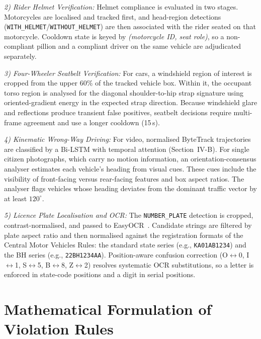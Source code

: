 \documentclass[conference]{IEEEtran}
\begin{document}
\textit{2) Rider Helmet Verification:} Helmet compliance is evaluated in two stages. Motorcycles are localised and tracked first, and head-region detections (\texttt{WITH\_HELMET}/\texttt{WITHOUT\_HELMET}) are then associated with the rider seated on that motorcycle. Cooldown state is keyed by \emph{(motorcycle ID, seat role)}, so a non-compliant pillion and a compliant driver on the same vehicle are adjudicated separately.

\textit{3) Four-Wheeler Seatbelt Verification:} For cars, a windshield region of interest is cropped from the upper 60\% of the tracked vehicle box. Within it, the occupant torso region is analysed for the diagonal shoulder-to-hip strap signature using oriented-gradient energy in the expected strap direction. Because windshield glare and reflections produce transient false positives, seatbelt decisions require multi-frame agreement and use a longer cooldown (15\,s).

\textit{4) Kinematic Wrong-Way Driving:} For video, normalised ByteTrack trajectories are classified by a Bi-LSTM with temporal attention (Section~IV-B). For single citizen photographs, which carry no motion information, an orientation-consensus analyser estimates each vehicle's heading from visual cues. These cues include the visibility of front-facing versus rear-facing features and box aspect ratios. The analyser flags vehicles whose heading deviates from the dominant traffic vector by at least $120^{\circ}$.

\textit{5) Licence Plate Localisation and OCR:} The \texttt{NUMBER\_PLATE} detection is cropped, contrast-normalised, and passed to EasyOCR~\cite{easyocr}. Candidate strings are filtered by plate aspect ratio and then normalised against the registration formats of the Central Motor Vehicles Rules: the standard state series (e.g., \texttt{KA01AB1234}) and the BH series (e.g., \texttt{22BH1234AA}). Position-aware confusion correction (O$\leftrightarrow$0, I$\leftrightarrow$1, S$\leftrightarrow$5, B$\leftrightarrow$8, Z$\leftrightarrow$2) resolves systematic OCR substitutions, so a letter is enforced in state-code positions and a digit in serial positions.

\section{Mathematical Formulation of Violation Rules}
\end{document}
